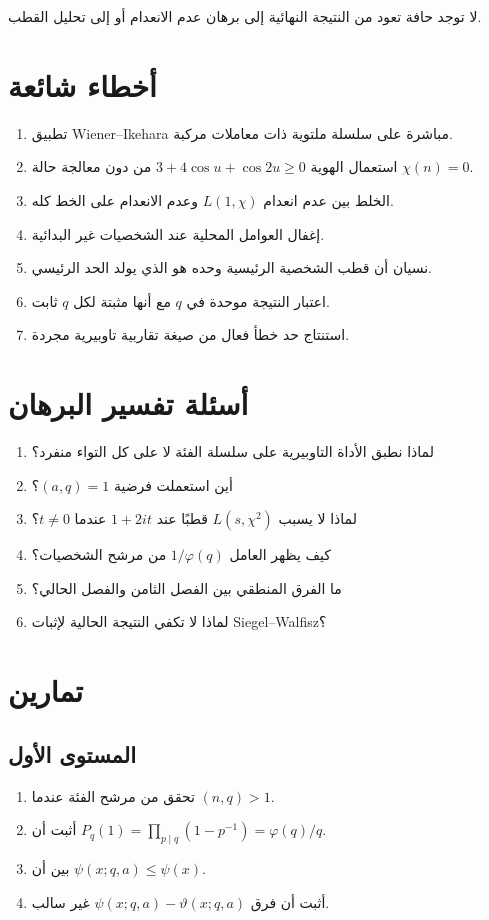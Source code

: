 لا توجد حافة تعود من النتيجة النهائية إلى برهان عدم الانعدام أو إلى
تحليل القطب.

\section{أخطاء شائعة}

\begin{enumerate}
  \item تطبيق Wiener--Ikehara مباشرة على سلسلة ملتوية ذات معاملات مركبة.
  \item استعمال الهوية \(3+4\cos u+\cos2u\ge0\) من دون معالجة حالة
  \(\chi(n)=0\).
  \item الخلط بين عدم انعدام \(L(1,\chi)\) وعدم الانعدام على الخط كله.
  \item إغفال العوامل المحلية عند الشخصيات غير البدائية.
  \item نسيان أن قطب الشخصية الرئيسية وحده هو الذي يولد الحد الرئيسي.
  \item اعتبار النتيجة موحدة في \(q\) مع أنها مثبتة لكل \(q\) ثابت.
  \item استنتاج حد خطأ فعال من صيغة تقاربية تاوبيرية مجردة.
\end{enumerate}

\section{أسئلة تفسير البرهان}

\begin{enumerate}
  \item لماذا نطبق الأداة التاوبيرية على سلسلة الفئة لا على كل التواء منفرد؟
  \item أين استعملت فرضية \((a,q)=1\)؟
  \item لماذا لا يسبب \(L(s,\chi^2)\) قطبًا عند \(1+2it\) عندما
  \(t\ne0\)؟
  \item كيف يظهر العامل \(1/\varphi(q)\) من مرشح الشخصيات؟
  \item ما الفرق المنطقي بين الفصل الثامن والفصل الحالي؟
  \item لماذا لا تكفي النتيجة الحالية لإثبات Siegel--Walfisz؟
\end{enumerate}

\section{تمارين}

\subsection{المستوى الأول}
\begin{enumerate}
  \item تحقق من مرشح الفئة عندما \((n,q)>1\).
  \item أثبت أن \(P_q(1)=\prod_{p\mid q}(1-p^{-1})=\varphi(q)/q\).
  \item بين أن \(\psi(x;q,a)\le\psi(x)\).
  \item أثبت أن فرق \(\psi(x;q,a)-\vartheta(x;q,a)\) غير سالب.
\end{enumerate}


